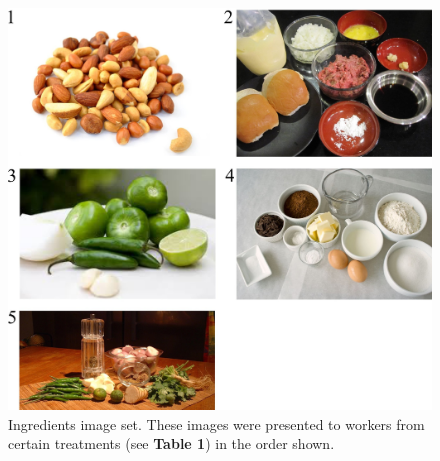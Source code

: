 \documentclass[letterpaper]{article}
\begin{document}
\begin{figure}
	\includegraphics[scale=1.00]{figs/taskImages/ingredients.jpg}
	\caption{ Ingredients image set. These images were presented to workers 
		from certain treatments (see \textbf{Table 1}) in the order shown.}
\end{figure}
\end{document}
